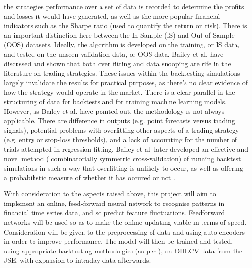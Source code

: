 \documentclass[a4paper,latin]{paper}
\begin{document}
the strategies performance over a set of data is recorded to determine the profits and losses it would have generated, as well as the more popular financial 
indicators such as the Sharpe ratio (used to quantify the return on risk). 
There is an important distinction here between the In-Sample (IS) and Out of Sample (OOS) datasets. 
Ideally, the algorithm is developed on the training, or IS data, and tested on the unseen validation data, or OOS data. 
Bailey et al. \cite {bailey} have discussed and shown that both over fitting and data snooping are rife in the literature on trading strategies. 
These issues within the backtesting simulations largely invalidate the results for practical purposes, as there’s no 
clear evidence of how the strategy would operate in the market. There is a clear parallel in the structuring of data 
for backtests and for training machine learning models. However, as Bailey et al. have pointed out, the methodology is not always applicable. 
There are difference in outputs (e.g. point forecasts versus trading signals), potential problems with overfitting other aspects of a trading strategy (e.g. entry or stop-loss thresholds), 
and a lack of accounting for the number of trials attempted in regression fitting. 
Bailey et al. later developed an effective and novel method ( combinatorially
symmetric cross-validation) of running backtest simulations 
in such a way that overfitting is unlikely to occur, as well as offering a 
probabilistic measure of whether it has occured or not \cite {bailey2}. 

\hfill \break \break
With consideration to the aspects raised above, this project will aim to 
implement an online, feed-forward neural network to recognise patterns in 
financial time series data, and so predict feature fluctuations. Feedforward 
networks will be used so as to make the online updating viable in terms of 
speed. Consideration will be given to the preprocessing of data and using auto-encoders in order to improve performance.
The model will then be trained and tested, using appropriate backtesting 
methodolgies (as per \cite {bailey2}), on OHLCV data from the JSE, with expansion to intraday data 
afterwards. 
\end{document}
